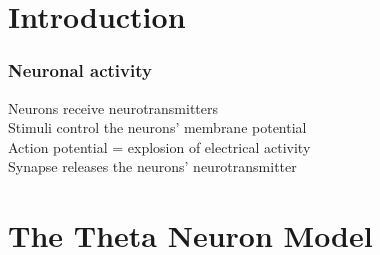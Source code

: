 
\section{Introduction}
\begin{frame}
\frametitle{Neuronal activity}
\tabitem Neurons receive neurotransmitters \\
\tabitem Stimuli control the neurons' membrane potential \\
\tabitem Action potential = explosion of electrical activity \\
\tabitem Synapse releases the neurons' neurotransmitter
\end{frame}


\section{The Theta Neuron Model}
